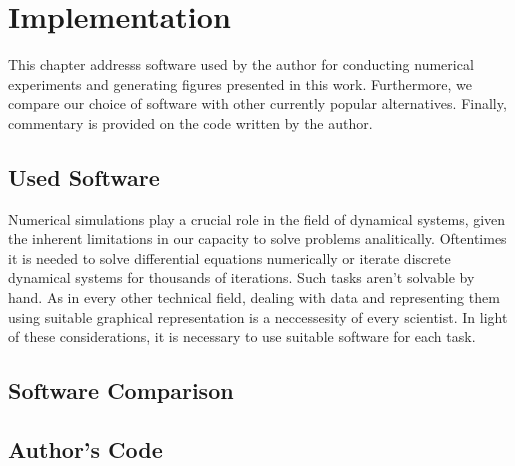 \chapter{Implementation}
\label{sec:implementation}

This chapter addresss software used by the author for conducting numerical experiments and generating figures presented in this work.
Furthermore, we compare our choice of software with other currently popular alternatives.
Finally, commentary is provided on the code written by the author.

\section{Used Software}
Numerical simulations play a crucial role in the field of dynamical systems, given the inherent limitations in our capacity to solve problems analitically.
Oftentimes it is needed to solve differential equations numerically or iterate discrete dynamical systems for thousands of iterations.
Such tasks aren't solvable by hand.
As in every other technical field, dealing with data and representing them using suitable graphical representation is a neccessesity of every scientist.
In light of these considerations, it is necessary to use suitable software for each task.
\par


\section{Software Comparison}

\section{Author's Code}

\endinput